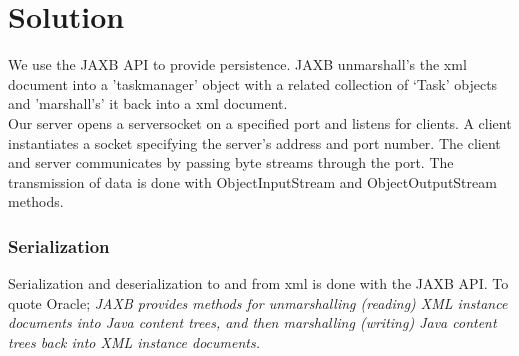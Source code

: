 \section{Solution}
\label{tcp_solution}


\begin{comment}
Information in OO programs are typically stored as data structures whereas data in the messages used to communicate in distributed systems are binary. So, no matter the communication protocols used the data structures need to be flattened before transmitting and then reassembled at the other end. This is called marshalling and unmarshalling. The sender and transmitter must agree on the format used in order for the receiver to reassmble the data structures. CORBA, Java Object Serialization and XML are som of the formats used to transmit binary data from one node to another. \\

This can (as it often is) be done by middleware. In this project we have used JAXB to marshall our taskmanager data structure. JAXB use a XML format to transfer binary data. This works by annotating the data structures. Our taskmanager data structure in this case. JAXB can then marshall and unmarshall our data structure.\\
\end{comment}


We use the JAXB API to provide persistence. JAXB  unmarshall's the xml document into a 'taskmanager' object with a related collection of ‘Task’ objects and 'marshall's' it back into a xml document. \\ 


Our server opens a serversocket on a specified port and listens for clients. A client instantiates a socket specifying the server's address and port number. The client and server  communicates by passing byte streams through the port. The transmission of data is done with ObjectInputStream and ObjectOutputStream methods. \\

\subsubsection{Serialization}
Serialization and deserialization to and from xml is done with the JAXB API. To quote Oracle; \textit{JAXB provides methods for unmarshalling (reading) XML instance documents into Java content trees, and then marshalling (writing) Java content trees back into XML instance documents.} \\

